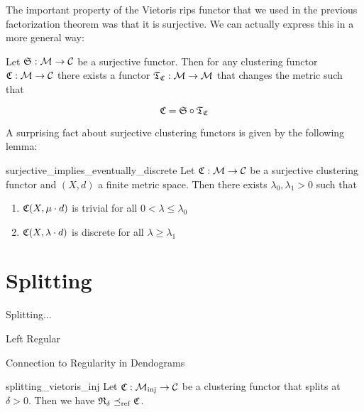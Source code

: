 The important property of the Vietoris rips functor that we used in the previous factorization theorem was that it is surjective. We can actually express this in a more general way:

\begin{proposition}{}{}
    Let $\mathfrak{S}: \mathcal{M} \to \mathcal{C}$ be a surjective functor. Then for any clustering functor $\mathfrak{C}: \mathcal{M} \to \mathcal{C}$ there exists a functor $\mathfrak{T}_{\mathfrak{C}}: \mathcal{M} \to \mathcal{M}$ that changes the metric such that

    \begin{equation*}
        \mathfrak{C} = \mathfrak{S} \circ \mathfrak{T}_{\mathfrak{C}}
    \end{equation*}

    \newresult
\end{proposition}

A surprising fact about surjective clustering functors is given by the following lemma:

\begin{lemma}{}{surjective_implies_eventually_discrete}
    Let $\mathfrak{C}: \mathcal{M} \to \mathcal{C}$ be a surjective clustering functor and $(X,d)$ a finite metric space. Then there exists $\lambda_0,\lambda_1 > 0$ such that
    \begin{enumerate}
        \item $\mathfrak{C}(X,\mu \cdot d)$ is trivial for all $0 < \lambda \le \lambda_0$
        \item $\mathfrak{C}(X,\lambda \cdot d)$ is discrete for all $\lambda \ge \lambda_1$
    \end{enumerate}

    \newresult
\end{lemma}

\section{Splitting}

\begin{definition}
    Splitting...
\end{definition}

\begin{definition}{Left Regular}{}
    \newresult
\end{definition}

\begin{myremark}{Connection to Regularity in Dendograms}{}
\end{myremark}

\begin{proposition}{}{splitting_vietoris_inj}
    Let $\mathfrak{C}: {\mathcal{M}_\mathrm{inj}} \to \mathcal{C}$ be a clustering functor that splits at $\delta > 0$. Then we have $\mathfrak{R}_\delta \preceq_\mathrm{ref} \mathfrak{C}$.
\end{proposition}

